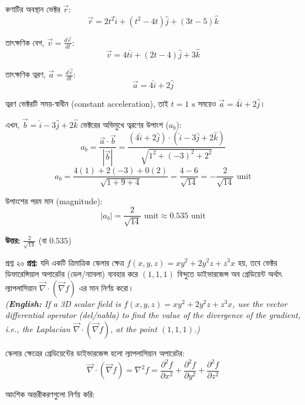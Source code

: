 \documentclass[11pt,a4paper]{article}
\begin{document}
\begin{solbox}
\begin{solbox}
কণাটির অবস্থান ভেক্টর $\vec{r}$:
$$\vec{r} = 2t^2\hat{i} + (t^2 - 4t)\hat{j} + (3t - 5)\hat{k}$$

তাৎক্ষণিক বেগ, $\vec{v} = \frac{d\vec{r}}{dt}$:
$$\vec{v} = 4t\hat{i} + (2t - 4)\hat{j} + 3\hat{k}$$

তাৎক্ষণিক ত্বরণ, $\vec{a} = \frac{d\vec{v}}{dt}$:
$$\vec{a} = 4\hat{i} + 2\hat{j}$$

ত্বরণ ভেক্টরটি সময়-স্বাধীন (constant acceleration), তাই $t = 1\text{ s}$ সময়েও $\vec{a} = 4\hat{i} + 2\hat{j}$।

এখন, $\vec{b} = \hat{i} - 3\hat{j} + 2\hat{k}$ ভেক্টরের অভিমুখে ত্বরণের উপাংশ ($a_b$):
$$a_b = \frac{\vec{a} \cdot \vec{b}}{|\vec{b}|} = \frac{(4\hat{i} + 2\hat{j}) \cdot (\hat{i} - 3\hat{j} + 2\hat{k})}{\sqrt{1^2 + (-3)^2 + 2^2}}$$
$$a_b = \frac{4(1) + 2(-3) + 0(2)}{\sqrt{1 + 9 + 4}} = \frac{4 - 6}{\sqrt{14}} = -\frac{2}{\sqrt{14}}\text{ unit}$$

উপাংশের পরম মান (magnitude):
$$|a_b| = \frac{2}{\sqrt{14}}\text{ unit} \approx 0.535\text{ unit}$$

\textbf{উত্তর:} $\frac{2}{\sqrt{14}}$ (বা $0.535$)
\end{solbox}

\vspace{0.4cm}

\begin{qbox}{প্রশ্ন ২০}
\textbf{প্রশ্ন:} যদি একটি ত্রিমাত্রিক স্কেলার ক্ষেত্র $f(x,y,z) = xy^2 + 2y^2z + z^3x$ হয়, তবে ভেক্টর ডিফারেন্সিয়াল অপারেটর (ডেল/ন্যাবলা) ব্যবহার করে $(1,1,1)$ বিন্দুতে ডাইভারজেন্স অব গ্রেডিয়েন্ট অর্থাৎ ল্যাপলাসিয়ান $\vec{\nabla}\cdot(\vec{\nabla}f)$ এর মান নির্ণয় করো। \\
\textit{(\textbf{English:} If a 3D scalar field is $f(x,y,z) = xy^2 + 2y^2z + z^3x$, use the vector differential operator (del/nabla) to find the value of the divergence of the gradient, i.e., the Laplacian $\vec{\nabla}\cdot(\vec{\nabla}f)$, at the point $(1,1,1)$.)}
\end{qbox}

\begin{solbox}
স্কেলার ক্ষেত্রের গ্রেডিয়েন্টের ডাইভারজেন্স হলো ল্যাপলাসিয়ান অপারেটর:
$$\vec{\nabla}\cdot(\vec{\nabla}f) = \nabla^2 f = \frac{\partial^2 f}{\partial x^2} + \frac{\partial^2 f}{\partial y^2} + \frac{\partial^2 f}{\partial z^2}$$

আংশিক অন্তরীকরণগুলো নির্ণয় করি:


\end{solbox}
\end{solbox}
\end{document}
